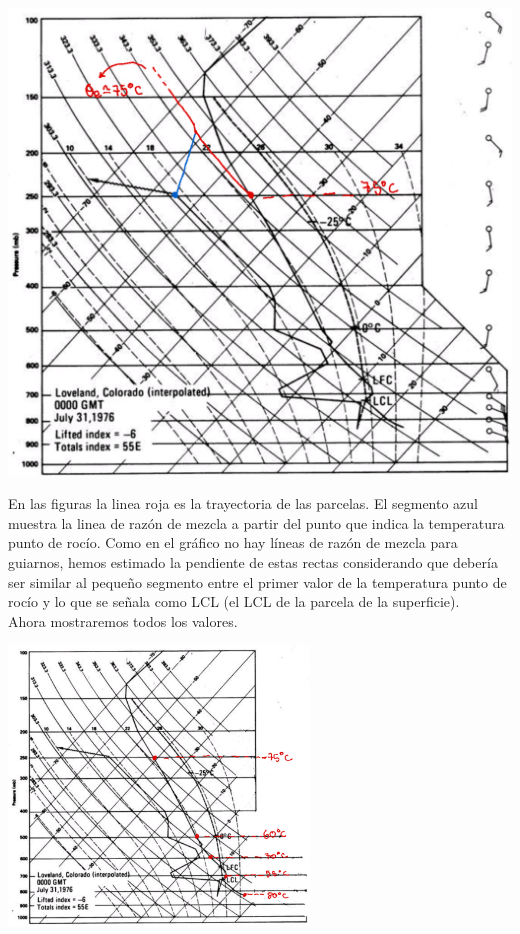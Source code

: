 \documentclass[../main.tex]{subfiles}
\begin{document}
\begin{enumerate}[a)]
\begin{center}
\begin{minipage}{0.5\linewidth}
      \includegraphics[width=\textwidth]{img/oe6}
\end{minipage}
\end{center}

En las figuras la linea roja es la trayectoria de las parcelas. El segmento azul muestra la linea de razón de mezcla a partir del punto que indica la temperatura punto de rocío. Como en el gráfico no hay líneas de razón de mezcla para guiarnos, hemos estimado la pendiente de estas rectas considerando que debería ser similar al pequeño segmento entre el primer valor de la temperatura punto de rocío y lo que se señala como LCL (el LCL de la parcela de la superficie).\\

Ahora mostraremos todos los valores.\\

\begin{minipage}{\linewidth}
    \centering
        \includegraphics[width=0.6\textwidth]{img/oe_todos}
        \label{oes}
\end{minipage}\\


\end{enumerate}
\end{document}
